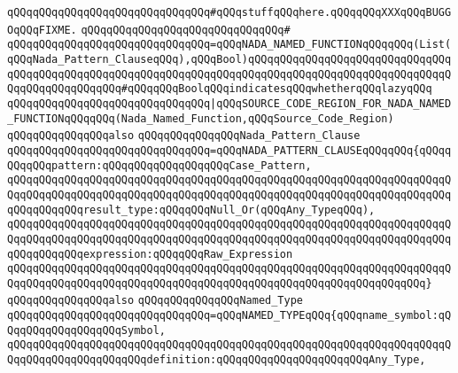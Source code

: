 \verb|qQQqqQQqqQQqqQQqqQQqqQQqqQQqqQQq#qQQqstuffqQQqhere.qQQqqQQqXXXqQQqBUGGOqQQqFIXME.|\newline
\verb|qQQqqQQqqQQqqQQqqQQqqQQqqQQqqQQq#|\newline
\verb|qQQqqQQqqQQqqQQqqQQqqQQqqQQqqQQq=qQQqNADA_NAMED_FUNCTIONqQQqqQQq(List(qQQqNada_Pattern_ClauseqQQq),qQQqBool)qQQqqQQqqQQqqQQqqQQqqQQqqQQqqQQqqQQqqQQqqQQqqQQqqQQqqQQqqQQqqQQqqQQqqQQqqQQqqQQqqQQqqQQqqQQqqQQqqQQqqQQqqQQqqQQqqQQqqQQq#qQQqqQQqBoolqQQqindicatesqQQqwhetherqQQqlazyqQQq|\newline
\verb|qQQqqQQqqQQqqQQqqQQqqQQqqQQqqQQq|\verb#|qQQqSOURCE_CODE_REGION_FOR_NADA_NAMED_FUNCTIONqQQqqQQq(Nada_Named_Function,qQQqSource_Code_Region)#\newline
\newline
\newline
\newline
\verb|qQQqqQQqqQQqqQQqalso|\newline
\verb|qQQqqQQqqQQqqQQqNada_Pattern_Clause|\newline
\newline
\verb|qQQqqQQqqQQqqQQqqQQqqQQqqQQqqQQq=qQQqNADA_PATTERN_CLAUSEqQQqqQQq{qQQqqQQqqQQqpattern:qQQqqQQqqQQqqQQqqQQqCase_Pattern,|\newline
\verb|qQQqqQQqqQQqqQQqqQQqqQQqqQQqqQQqqQQqqQQqqQQqqQQqqQQqqQQqqQQqqQQqqQQqqQQqqQQqqQQqqQQqqQQqqQQqqQQqqQQqqQQqqQQqqQQqqQQqqQQqqQQqqQQqqQQqqQQqqQQqqQQqqQQqqQQqresult_type:qQQqqQQqNull_Or(qQQqAny_TypeqQQq),|\newline
\verb|qQQqqQQqqQQqqQQqqQQqqQQqqQQqqQQqqQQqqQQqqQQqqQQqqQQqqQQqqQQqqQQqqQQqqQQqqQQqqQQqqQQqqQQqqQQqqQQqqQQqqQQqqQQqqQQqqQQqqQQqqQQqqQQqqQQqqQQqqQQqqQQqqQQqqQQqexpression:qQQqqQQqRaw_Expression|\newline
\verb|qQQqqQQqqQQqqQQqqQQqqQQqqQQqqQQqqQQqqQQqqQQqqQQqqQQqqQQqqQQqqQQqqQQqqQQqqQQqqQQqqQQqqQQqqQQqqQQqqQQqqQQqqQQqqQQqqQQqqQQqqQQqqQQqqQQqqQQq}|\newline
\newline
\newline
\newline
\verb|qQQqqQQqqQQqqQQqalso|\newline
\verb|qQQqqQQqqQQqqQQqNamed_Type|\newline
\newline
\verb|qQQqqQQqqQQqqQQqqQQqqQQqqQQqqQQq=qQQqNAMED_TYPEqQQq{qQQqname_symbol:qQQqqQQqqQQqqQQqqQQqSymbol,|\newline
\verb|qQQqqQQqqQQqqQQqqQQqqQQqqQQqqQQqqQQqqQQqqQQqqQQqqQQqqQQqqQQqqQQqqQQqqQQqqQQqqQQqqQQqqQQqqQQqdefinition:qQQqqQQqqQQqqQQqqQQqqQQqAny_Type,|\newline
